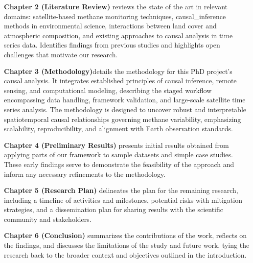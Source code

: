 \textbf{Chapter 2 (Literature Review)} reviews the state of the art in relevant domains: satellite-based methane monitoring techniques, \gls{causal_inference} methods in environmental science, interactions between land cover and atmospheric composition, and existing approaches to causal analysis in time series data. Identifies findings from previous studies and highlights open challenges that motivate our research.

\textbf{Chapter 3 (Methodology)}details the methodology for this PhD project's causal analysis. It integrates established principles of causal inference, remote sensing, and computational modeling, describing the staged workflow encompassing data handling, framework validation, and large-scale satellite time series analysis. The methodology is designed to uncover robust and interpretable spatiotemporal causal relationships governing methane variability, emphasizing scalability, reproducibility, and alignment with Earth observation standards.

\textbf{Chapter 4 (Preliminary Results)} presents initial results obtained from applying parts of our framework to sample datasets and simple case studies. These early findings serve to demonstrate the feasibility of the approach and inform any necessary refinements to the methodology.

\textbf{Chapter 5 (Research Plan)} delineates the plan for the remaining research, including a timeline of activities and milestones, potential risks with mitigation strategies, and a dissemination plan for sharing results with the scientific community and stakeholders.

\textbf{Chapter 6 (Conclusion)} summarizes the contributions of the work, reflects on the findings, and discusses the limitations of the study and future work, tying the research back to the broader context and objectives outlined in the introduction.

